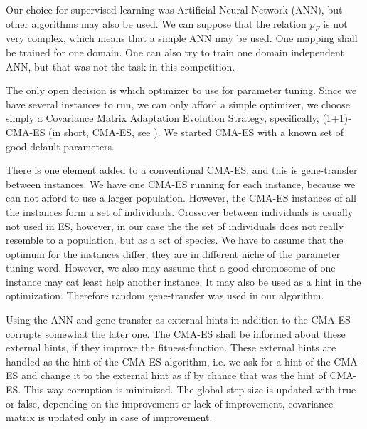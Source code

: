 \documentclass{article}
\begin{document}
Our choice for supervised learning was Artificial Neural Network (ANN), but other algorithms may also be used. We can suppose that the relation \begin{math}p_F\end{math} is not very complex, which means that a simple ANN may be used. One mapping shall be trained for one domain. One can also try to train one domain independent ANN, but that was not the task in this competition.

The only open decision is which optimizer to use for parameter tuning. Since we have several instances to run, we can only afford a simple optimizer, we choose simply a Covariance Matrix Adaptation Evolution Strategy, specifically, (1+1)-CMA-ES (in short, CMA-ES, see \cite{hansen2001ecj}). We started CMA-ES with a known set of good default parameters.

There is one element added to a conventional CMA-ES, and this is gene-transfer between instances. We have one CMA-ES running for each instance, because we can not afford to use a larger population. However, the CMA-ES instances of all the instances form a set of individuals. Crossover between individuals is usually not used in ES, however, in our case the the set of individuals does not really resemble to a population, but as a set of species. We have to assume that the optimum for the instances differ, they are in different niche of the parameter tuning word. However, we also may assume that a good chromosome of one instance may cat least help another instance. It may also be used as a hint in the optimization. Therefore random gene-transfer was used in our algorithm. 

Using the ANN and gene-transfer as external hints in addition to the CMA-ES corrupts somewhat the later one. The CMA-ES shall be informed about these external hints, if they improve the fitness-function. These external hints are handled as the hint of the CMA-ES algorithm, i.e. we ask for a hint of the CMA-ES and change it to the external hint as if by chance that was the hint of CMA-ES. This way corruption is minimized. The global step size is updated with true or false, depending on the improvement or lack of improvement, covariance matrix is updated only in case of improvement.
\end{document}
